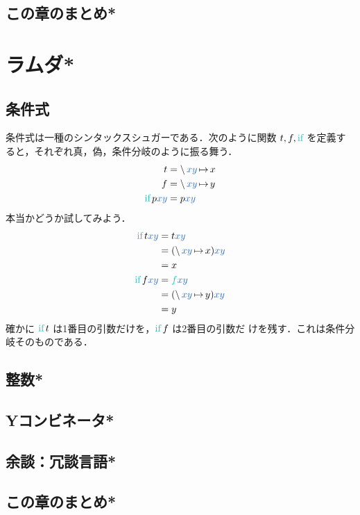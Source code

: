 \documentclass[a5paper,twoside,fleqn,draft]{jsbook}
\def\varColor{NavyBlue}
\def\funcColor{BlueGreen}
\newcommand{\mVar}[1]{\textcolor{\varColor}{#1}}
\newcommand{\mXVar}{\mVar{x}}
\newcommand{\mYVar}{\mVar{y}}
\newcommand{\mFunc}[1]{\textcolor{\funcColor}{#1}}
\newcommand{\mSpecialFunc}[1]{\textcolor{\funcColor}{\textrm{#1}}}
\newcommand{\mFFunc}{{\mFunc{f}}}
\DeclareMathOperator{\mIfFunc}{\mSpecialFunc{if}}
\DeclareMathOperator{\mLambda}{\backslash}
\DeclareMathOperator{\mLambdaArrow}{\mapsto}
\newcommand{\mLambdaEXP}[2]{\mLambda{#1}\mLambdaArrow{#2}} %
\begin{document}
\section{この章のまとめ*}


\chapter{ラムダ*}
\label{ch:lambda}

\section{条件式}

条件式は一種のシンタックスシュガーである．次のように関数
$t,f,\mIfFunc$ を定義すると，それぞれ真，偽，条件分岐のように振る舞う．
\begin{align}
t&=\mLambdaEXP{\mXVar\mYVar}{x}\\
f&=\mLambdaEXP{\mXVar\mYVar}{y}\\
\mIfFunc p\mXVar\mYVar&=p\mXVar\mYVar
\end{align}
本当かどうか試してみよう．
\begin{align}
\mIfFunc t\mXVar\mYVar&=t\mXVar\mYVar\\
&=(\mLambdaEXP{\mXVar\mYVar}{x})\mXVar\mYVar\\
&=x\\
\mIfFunc f\mXVar\mYVar&=\mFFunc\mXVar\mYVar\\
&=(\mLambdaEXP{\mXVar\mYVar}{y})\mXVar\mYVar\\
&=y
\end{align}
確かに $\mIfFunc t$ は1番目の引数だけを，$\mIfFunc f$ は2番目の引数だ
けを残す．これは条件分岐そのものである．

\section{整数*}
\section{Yコンビネータ*}


\section{余談：冗談言語*}


\section{この章のまとめ*}
\end{document}
